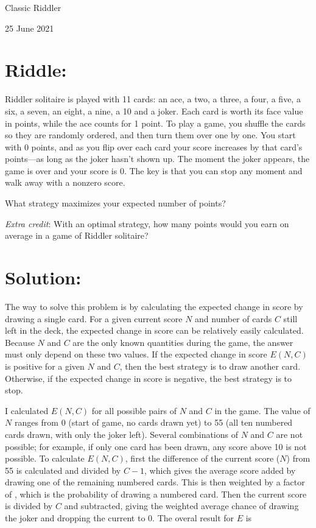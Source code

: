 \documentclass{article}
\begin{document}
\pagestyle{empty} %

\begin{center}
{\LARGE Classic Riddler}

\vspace{0.15in}

{\Large 25 June 2021}
\end{center}


\section*{Riddle:}

Riddler solitaire is played with 11 cards: an ace, a two, a three, a four, a five, a six, a seven, an eight, a nine, a 10 and a joker.
Each card is worth its face value in points, while the ace counts for 1 point.
To play a game, you shuffle the cards so they are randomly ordered, and then turn them over one by one.
You start with 0 points, and as you flip over each card your score increases by that card's points---as long as the joker hasn't shown up.
The moment the joker appears, the game is over and your score is 0.
The key is that you can stop any moment and walk away with a nonzero score.

What strategy maximizes your expected number of points?

\textit{Extra credit}: With an optimal strategy, how many points would you earn on average in a game of Riddler solitaire?


\section*{Solution:}

The way to solve this problem is by calculating the expected change in score by drawing a single card.
For a given current score $N$ and number of cards $C$ still left in the deck, the expected change in score can be relatively easily calculated.
Because $N$ and $C$ are the only known quantities during the game, the answer must only depend on these two values.
If the expected change in score $E(N,C)$ is positive for a given $N$ and $C$, then the best strategy is to draw another card.
Otherwise, if the expected change in score is negative, the best strategy is to stop.

I calculated $E(N,C)$ for all possible pairs of $N$ and $C$ in the game.
The value of $N$ ranges from 0 (start of game, no cards drawn yet) to 55 (all ten numbered cards drawn, with only the joker left).
Several combinations of $N$ and $C$ are not possible; for example, if only one card has been drawn, any score above 10 is not possible.
To calculate $E(N,C)$, first the difference of the current score ($N$) from 55 is calculated and divided by $C-1$, which gives the average score added by drawing one of the remaining numbered cards.
This is then weighted by a factor of , which is the probability of drawing a numbered card.
Then the current score is divided by $C$ and subtracted, giving the weighted average chance of drawing the joker and dropping the current to 0.
The overal result for $E$ is
\end{document}
